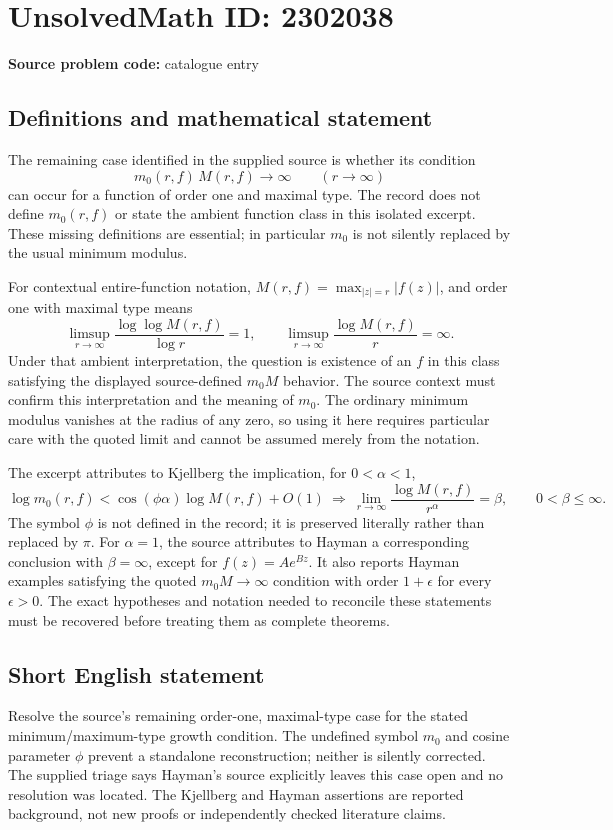 \documentclass[11pt]{article}
\begin{document}
\section*{UnsolvedMath ID: 2302038}
\textbf{Source problem code:} catalogue entry
\subsection{Definitions and mathematical statement}
The remaining case identified in the supplied source is whether its condition
\[
 m_0(r,f)\,M(r,f)\longrightarrow\infty\qquad(r\to\infty)
\]
can occur for a function of order one and maximal type. The record does not define $m_0(r,f)$ or state the ambient function class in this isolated excerpt. These missing definitions are essential; in particular $m_0$ is not silently replaced by the usual minimum modulus.

For contextual entire-function notation, $M(r,f)=\max_{|z|=r}|f(z)|$, and order one with maximal type means
\[
 \limsup_{r\to\infty}\frac{\log\log M(r,f)}{\log r}=1,
 \qquad
 \limsup_{r\to\infty}\frac{\log M(r,f)}{r}=\infty.
\]
Under that ambient interpretation, the question is existence of an $f$ in this class satisfying the displayed source-defined $m_0M$ behavior. The source context must confirm this interpretation and the meaning of $m_0$. The ordinary minimum modulus vanishes at the radius of any zero, so using it here requires particular care with the quoted limit and cannot be assumed merely from the notation.

The excerpt attributes to Kjellberg the implication, for $0<\alpha<1$,
\[
 \log m_0(r,f)<\cos(\phi\alpha)\log M(r,f)+O(1)
 \ \Longrightarrow\ 
 \lim_{r\to\infty}\frac{\log M(r,f)}{r^\alpha}=\beta,
 \qquad0<\beta\leq\infty.
\]
The symbol $\phi$ is not defined in the record; it is preserved literally rather than replaced by $\pi$. For $\alpha=1$, the source attributes to Hayman a corresponding conclusion with $\beta=\infty$, except for $f(z)=Ae^{Bz}$. It also reports Hayman examples satisfying the quoted $m_0M\to\infty$ condition with order $1+\epsilon$ for every $\epsilon>0$. The exact hypotheses and notation needed to reconcile these statements must be recovered before treating them as complete theorems.
\subsection{Short English statement}
Resolve the source's remaining order-one, maximal-type case for the stated minimum/maximum-type growth condition. The undefined symbol $m_0$ and cosine parameter $\phi$ prevent a standalone reconstruction; neither is silently corrected. The supplied triage says Hayman's source explicitly leaves this case open and no resolution was located. The Kjellberg and Hayman assertions are reported background, not new proofs or independently checked literature claims.
\end{document}
